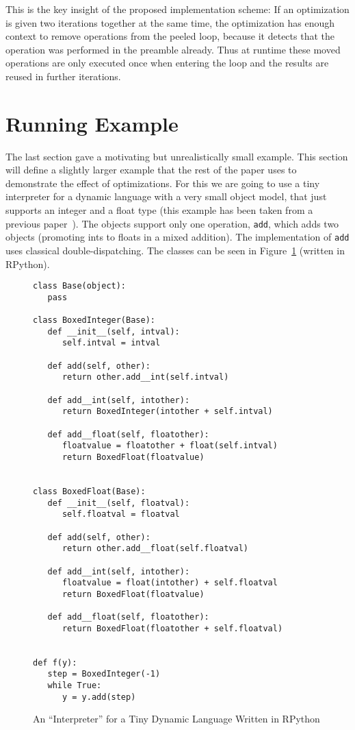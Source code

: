 \documentclass[preprint]{sigplanconf}
\let\oldcite=\cite
\renewcommand\cite[1]{\ifthenelse{\equal{#1}{XXX}}{[citation~needed]}{\oldcite{#1}}}
\begin{document}
This is the key insight of the proposed implementation scheme: If an
optimization is given two iterations together at the same time, the
optimization has enough context to remove operations from the peeled loop,
because it detects
that the operation was performed in the preamble already. Thus at runtime these
moved operations are only executed once when entering the loop and the results
are reused in further iterations.



\section{Running Example}
\label{sub:example}

The last section gave a motivating but unrealistically small example.
This section will define a slightly larger example that the rest of the paper
uses to demonstrate the effect of optimizations.
For this we are going to use a tiny interpreter for a dynamic language with
 a very small object
model, that just supports an integer and a float type (this example has been taken from a previous paper~\cite{bolz_allocation_2011}). The objects support only
one operation, \lstinline{add}, which adds two objects (promoting ints to floats in a
mixed addition). The implementation of \lstinline{add} uses classical
double-dispatching.
The classes can be seen in
Figure~\ref{fig:objmodel} (written in RPython).

\begin{figure}
\begin{lstlisting}[mathescape,basicstyle=\setstretch{1.05}\ttfamily\scriptsize]
class Base(object):
   pass

class BoxedInteger(Base):
   def __init__(self, intval):
      self.intval = intval

   def add(self, other):
      return other.add__int(self.intval)

   def add__int(self, intother):
      return BoxedInteger(intother + self.intval)

   def add__float(self, floatother):
      floatvalue = floatother + float(self.intval)
      return BoxedFloat(floatvalue)


class BoxedFloat(Base):
   def __init__(self, floatval):
      self.floatval = floatval

   def add(self, other):
      return other.add__float(self.floatval)

   def add__int(self, intother):
      floatvalue = float(intother) + self.floatval
      return BoxedFloat(floatvalue)

   def add__float(self, floatother):
      return BoxedFloat(floatother + self.floatval)


def f(y):
   step = BoxedInteger(-1)
   while True:
      y = y.add(step)
\end{lstlisting}
\caption{An ``Interpreter'' for a Tiny Dynamic Language Written in RPython}
\label{fig:objmodel}
\end{figure}
\end{document}
